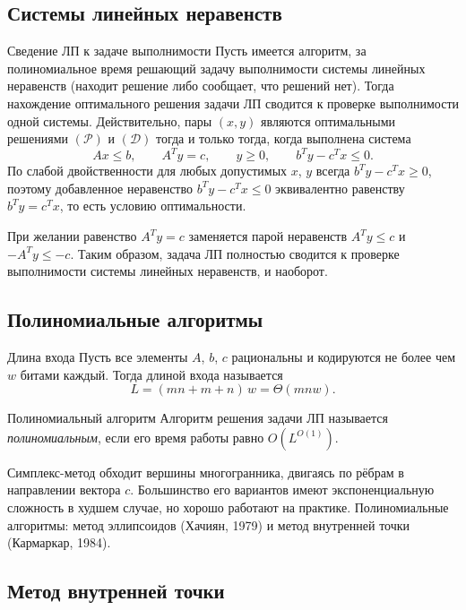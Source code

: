 \subsection{Системы линейных неравенств}

\begin{Remark}{Сведение ЛП к задаче выполнимости}{}
	Пусть имеется алгоритм, за полиномиальное время решающий задачу выполнимости системы линейных неравенств (находит решение либо сообщает, что решений нет). Тогда нахождение оптимального решения задачи ЛП сводится к проверке выполнимости одной системы. Действительно, пары $(x, y)$ являются оптимальными решениями $(\mathcal{P})$ и $(\mathcal{D})$ тогда и только тогда, когда выполнена система
	\[
	Ax \le b,\qquad A^T y = c,\qquad y \ge 0,\qquad b^T y - c^T x \le 0.
	\]
	По слабой двойственности для любых допустимых $x$, $y$ всегда $b^T y - c^T x \ge 0$, поэтому добавленное неравенство $b^T y - c^T x \le 0$ эквивалентно равенству $b^T y = c^T x$, то есть условию оптимальности.
	
	При желании равенство $A^T y = c$ заменяется парой неравенств $A^T y \le c$ и $-A^T y \le -c$. Таким образом, задача ЛП полностью сводится к проверке выполнимости системы линейных неравенств, и наоборот.
\end{Remark}

\subsection{Полиномиальные алгоритмы}

\begin{Definition}{Длина входа}{}
	Пусть все элементы $A$, $b$, $c$ рациональны и кодируются не более чем $w$ битами каждый. Тогда длиной входа называется
	\[
	L = (mn + m + n)\, w = \Theta(mnw).
	\]
\end{Definition}

\begin{Definition}{Полиномиальный алгоритм}{}
	Алгоритм решения задачи ЛП называется \emph{полиномиальным}, если его время работы равно $O(L^{O(1)})$.
\end{Definition}

Симплекс-метод обходит вершины многогранника, двигаясь по рёбрам в направлении вектора $c$. Большинство его вариантов имеют экспоненциальную сложность в худшем случае, но хорошо работают на практике. Полиномиальные алгоритмы: метод эллипсоидов (Хачиян, 1979) и метод внутренней точки (Кармаркар, 1984).

\subsection{Метод внутренней точки}

